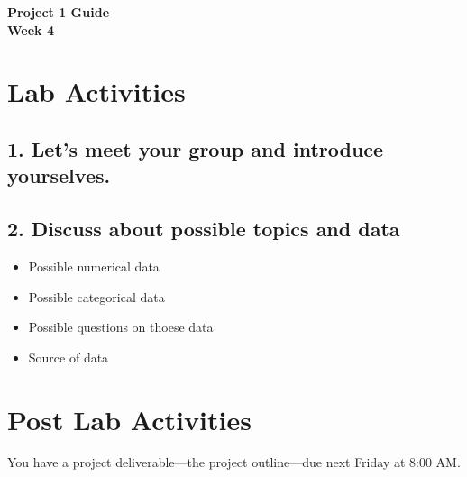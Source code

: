 \documentclass[12pt]{article}
\begin{document}
\begin{center}
\textbf{\Large Project 1 Guide \\ Week 4 } 
\end{center}




\section*{Lab Activities}

\subsection*{1. Let's meet your group and introduce yourselves.  } 

\vspace{6\baselineskip}

\subsection*{2. Discuss about possible topics and data }

\begin{itemize}
    \item Possible numerical data
\end{itemize}

\vspace{2\baselineskip}

\begin{itemize}
    \item Possible categorical data
\end{itemize}

\vspace{2\baselineskip}

\begin{itemize}
    \item Possible questions on thoese data
\end{itemize}

\vspace{2\baselineskip}

\begin{itemize}
    \item Source of data 
\end{itemize}


\vspace{2\baselineskip}

\section*{Post Lab Activities}
You have a project deliverable—the project outline—due next Friday at 8:00 AM.
\end{document}
